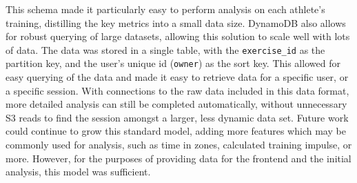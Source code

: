 This schema made it particularly easy to perform analysis on each athlete's training, distilling the key metrics into a small data size. DynamoDB also allows for robust querying of large datasets, allowing this solution to scale well with lots of data. The data was stored in a single table, with the \texttt{exercise\_id} as the partition key, and the user's unique id (\texttt{owner}) as the sort key. This allowed for easy querying of the data and made it easy to retrieve data for a specific user, or a specific session. With connections to the raw data included in this data format, more detailed analysis can still be completed automatically, without unnecessary S3 reads to find the session amongst a larger, less dynamic data set. Future work could continue to grow this standard model, adding more features which may be commonly used for analysis, such as time in zones, calculated training impulse, or more. However, for the purposes of providing data for the frontend and the initial analysis, this model was sufficient.

